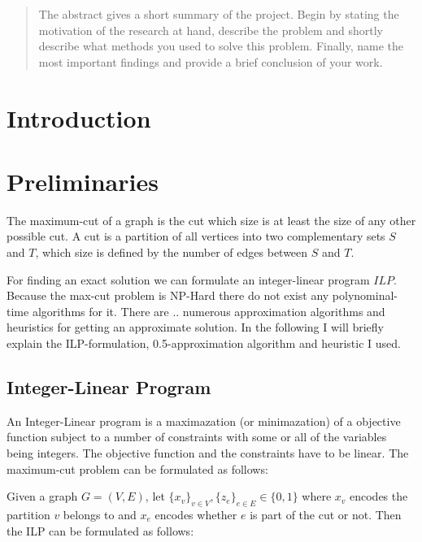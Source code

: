 \documentclass[twocolumn]{article}
\begin{document}


\begin{abstract}
    The abstract gives a short summary of the project. Begin by stating the motivation of the research at hand, describe the problem and shortly describe what methods you used to solve this problem. Finally, name the most important findings and provide a brief conclusion of your work.
\end{abstract}


\section{Introduction}

\section{Preliminaries}
The maximum-cut of a graph is the cut which size is at least the size of any other possible cut.
A cut is a partition of all vertices into two complementary sets $S$ and $T$,
which size is defined by the number of edges between $S$ and $T$.

For finding an exact solution we can formulate an integer-linear program \(ILP\).
Because the max-cut problem is NP-Hard there do not exist any polynominal-time algorithms for it.
There are .. numerous approximation algorithms and heuristics for getting an approximate solution.
In the following I will briefly explain the ILP-formulation, 0.5-approximation algorithm and heuristic
I used.

\subsection{Integer-Linear Program}
An Integer-Linear program is a maximazation (or minimazation) of a objective function subject to a number of constraints with some or all of the variables being integers.
The objective function and the constraints have to be linear.
The maximum-cut problem can be formulated as follows:

Given a graph $G = (V, E)$, let $\{x_v\}_{v \in V}, \{z_e\}_{e \in E} \in \{0, 1\}$ where $x_v$ encodes the partition $v$ belongs to
and $x_e$ encodes whether $e$ is part of the cut or not.
Then the ILP can be formulated as follows:
\end{document}
